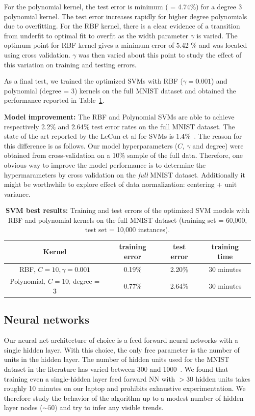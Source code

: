 \documentclass[10pt,letterpaper]{article}
\begin{document}
For the polynomial kernel, the test error is minimum ( = 4.74\%) for a degree 3 polynomial kernel. The test error increases rapidly for higher degree polynomials due to overfitting. For the RBF kernel, there is a clear evidence of a transition from underfit to optimal fit to overfit as the width parameter $\gamma$ is varied. The optimum point for RBF kernel gives a minimum error of 5.42 \% and was located using cross validation. $\gamma$ was then varied about this point to study the effect of this variation on training and testing errors.

As a final test, we trained the optimized SVMs with RBF ($\gamma = 0.001$) and polynomial (degree = 3) kernels on the full MNIST dataset and obtained the performance reported in Table~\ref{tab1}.

{\bf Model improvement:} The RBF and Polynomial SVMs are able to achieve respectively 2.2\% and 2.64\% test error rates on the full MNIST dataset. The state of the art reported by the LeCun et al for SVMs is 1.4\%~\cite{mnist}. The reason for this difference is as follows. Our model hyperparameters ($C$, $\gamma$ and degree) were obtained from cross-validation on a 10\% sample of the full data. Therefore, one obvious way to improve the model performance is to determine the hypermarameters by cross validation on the {\em full} MNIST dataset. Additionally it might be worthwhile to explore effect of data normalization: centering + unit variance. 
\begin{table}[tbp]
	\caption{{\bf SVM best results:} Training and test errors of the optimized SVM models with RBF and polynomial kernels on the full MNIST dataset (training set = 60,000, test set = 10,000 instances).\label{tab1}}
	\centering
    \begin{tabular}{c|c|c|c}
         \hline
            	{\bf Kernel}&{\bf training error} & {\bf test error} & {\bf training time}\\ \hline \hline
            	RBF, $C=10, \gamma=0.001$&0.19\%&2.20\% & 30 minutes\\	
            	Polynomial, $C=10$, degree = 3&0.77\%&2.64\% & 30 minutes\\ \hline
    \end{tabular}
\end{table}
\subsection{Neural networks}
Our neural net architecture of choice is a feed-forward neural networks with a single hidden layer. With this choice, the only free parameter is the number of units in the hidden layer. The number of hidden units used for the MNIST dataset in the literature has varied between 300 and 1000~\cite{mnist}. We found that training even a single-hidden layer feed forward NN with $>30$ hidden units takes roughly 10 minutes on our laptop and prohibits exhaustive experimentation. We therefore study the behavior of the algorithm up to a modest number of hidden layer nodes ($\sim 50$) and try to infer any visible trends. 
\end{document}

